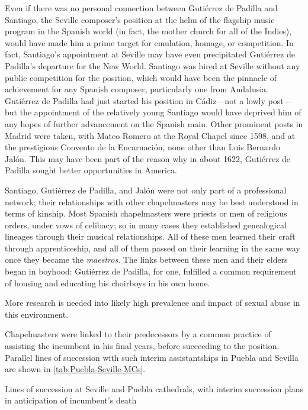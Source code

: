 Even if there was no personal connection between Gutiérrez de Padilla and
Santiago, the Seville composer's position at the helm of the flagship music
program in the Spanish world (in fact, the mother church for all of the Indies),
would have made him a prime target for emulation, homage, or competition.
In fact, Santiago's appointment at Seville may have even precipitated Gutiérrez
de Padilla's departure for the New World.
Santiago was hired at Seville without any public competition for the position,
which would have been the pinnacle of achievement for any Spanish composer,
particularly one from Andalusia.
Gutiérrez de Padilla had just started his position in Cádiz---not a lowly
post---but the appointment of the relatively young Santiago would have deprived
him of any hopes of further advancement on the Spanish main.
Other prominent posts in Madrid were taken, with Mateo Romero at the Royal
Chapel since 1598, and at the prestigious Convento de la Encarnación, none other
than Luis Bernardo Jalón.%
    \Autocite{Ezquerro:JalonLB} 
This may have been part of the reason why in about 1622, Gutiérrez de Padilla
sought better opportunities in America.

Santiago, Gutiérrez de Padilla, and Jalón were not only part of a professional
network; their relationships with other chapelmasters may be best understood in
terms of kinship.
Most Spanish chapelmasters were priests or men of religious orders, under vows
of celibacy; so in many cases they established genealogical lineages through
their musical relationships.
All of these men learned their craft through apprenticeship, and all of them
passed on their learning in the same way once they became the \emph{maestros}.
The links between these men and their elders began in boyhood: Gutiérrez de
Padilla, for one, fulfilled a common requirement of housing and educating his
choirboys in his own home.%
\begin{Footnote} 
    More research is needed into likely high prevalence and impact of sexual
    abuse in this environment.
\end{Footnote}
Chapelmasters were linked to their predecessors by a common practice of
assisting the incumbent in his final years, before succeeding to the position.
Parallel lines of succession with such interim assistantships in Puebla and
Sevilla are shown in \cref{tab:Puebla-Seville-MCs}.

\begin{table}
    \caption{Lines of succession at Seville and Puebla cathedrals, with interim
    succession plans in anticipation of incumbent's death}
  
    \label{tab:Puebla-Seville-MCs}
\end{table}

